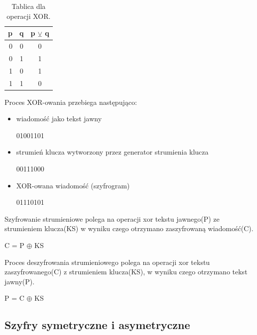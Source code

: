 \documentclass[12p]{article}
\begin{document}
\begin{table}[!h]
\centering
\begin{tabular}{|r|c|l|}
\hline
p & q & p $\veebar$ q \\
\hline
0 & 0 & \multicolumn{1}{|c|}{0} \\
\hline
0 & 1 & \multicolumn{1}{|c|}{1} \\
\hline
1 & 0 & \multicolumn{1}{|c|}{1} \\
\hline
1 & 1 & \multicolumn{1}{|c|}{0} \\
\hline
\end{tabular}
\caption{Tablica dla operacji XOR.}\label{xor}
\end{table}
Proces XOR-owania przebiega następująco:
\begin{itemize}
\item wiadomość jako tekst jawny \newline
\begin{center}
01001101
\end{center}
\item strumień klucza wytworzony przez generator strumienia klucza \newline
\begin{center}
00111000
\end{center}
\item XOR-owana wiadomość (szyfrogram) \newline
\begin{center}
01110101
\end{center}
\end{itemize}
Szyfrowanie strumieniowe polega na operacji xor tekstu jawnego(P) ze strumieniem klucza(KS) w wyniku czego otrzymano zaszyfrowaną wiadomość(C).\newline
\begin{center}
C = P $\oplus$ KS
\end{center}
Proces deszyfrowania strumieniowego polega na operacji xor tekstu zaszyfrowanego(C) z strumieniem klucza(KS), w wyniku czego otrzymano tekst jawny(P).~\cite{stream_cipher}\newline
\begin{center}
P = C $\oplus$ KS
\end{center}

\subsection{Szyfry symetryczne i asymetryczne}
\end{document}
